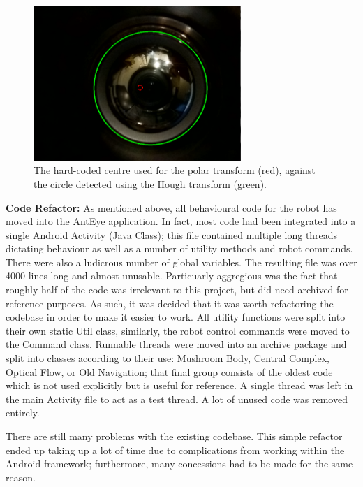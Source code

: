 \documentclass[a4paper,11pt,twoside,openright]{article}
\begin{document}
\begin{figure}
  \centering
  \includegraphics[width=0.7\textwidth]{Centre}
  \caption{\label{fig:centre} The hard-coded centre used for the polar transform
    (red), against the circle detected using the Hough transform (green).
   }
\end{figure}

\textbf{Code Refactor:} As mentioned above, all behavioural code for
the robot has moved into the AntEye application. In fact, most code
had been integrated into a single Android Activity (Java Class); this
file contained multiple long threads dictating behaviour as well as a
number of utility methods and robot commands. There were also a
ludicrous number of global variables. The resulting file was over 4000
lines long and almost unusable. Particuarly aggregious was the fact
that roughly half of the code was irrelevant to this project, but did
need archived for reference purposes. As such, it was decided that it
was worth refactoring the codebase in order to make it easier to
work. All utility functions were split into their own static Util
class, similarly, the robot control commands were moved to the Command
class. Runnable threads were moved into an archive package and split
into classes according to their use: Mushroom Body, Central Complex,
Optical Flow, or Old Navigation; that final group consists of the
oldest code which is not used explicitly but is useful for
reference. A single thread was left in the main Activity file to act
as a test thread. A lot of unused code was removed entirely.
\newline
\par

There are still many problems with the existing codebase. This simple refactor
ended up taking up a lot of time due to complications from working within the
Android framework; furthermore, many concessions had to be made for the same
reason.
\newline
\par
\end{document}
